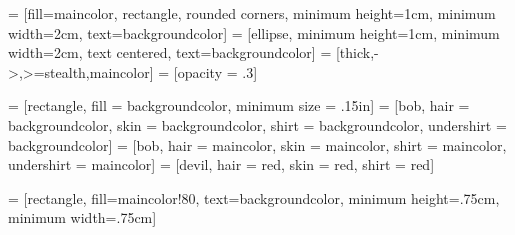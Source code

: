 \usetikzlibrary{backgrounds,fit,automata,positioning,shapes.geometric}



 = [fill=maincolor, rectangle, rounded corners, minimum height=1cm, minimum width=2cm, text=backgroundcolor]
 = [ellipse, minimum height=1cm, minimum width=2cm, text centered, text=backgroundcolor]
 = [thick,->,>=stealth,maincolor]
 = [opacity = .3]

 = [rectangle, fill = backgroundcolor, minimum size = .15in]
 = [bob, hair = backgroundcolor, skin = backgroundcolor, shirt = backgroundcolor, undershirt = backgroundcolor]
 = [bob, hair = maincolor, skin = maincolor, shirt = maincolor, undershirt = maincolor]
 = [devil, hair = red, skin = red, shirt = red]

 = [rectangle, fill=maincolor!80, text=backgroundcolor, minimum height=.75cm, minimum width=.75cm]

\newcommand{\thankyoupage}{
    \section*{}
    \begin{frame}
        \begin{center}
            \color{maincolor} \Huge \bf Thank You
        \end{center}
    \end{frame}
}
